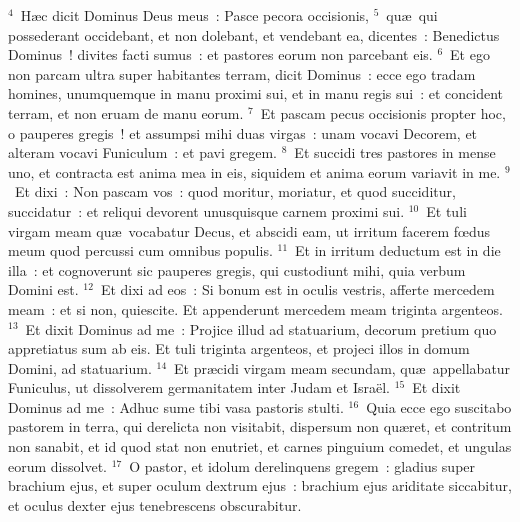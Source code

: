 ${}^{4}$~H\ae c dicit Dominus Deus meus~: Pasce pecora occisionis,
${}^{5}$~qu\ae\ qui possederant occidebant, et non dolebant, et vendebant ea, dicentes~: Benedictus Dominus~! divites facti sumus~: et pastores eorum non parcebant eis.
${}^{6}$~Et ego non parcam ultra super habitantes terram, dicit Dominus~: ecce ego tradam homines, unumquemque in manu proximi sui, et in manu regis sui~: et concident terram, et non eruam de manu eorum.
${}^{7}$~Et pascam pecus occisionis propter hoc, o pauperes gregis~! et assumpsi mihi duas virgas~: unam vocavi Decorem, et alteram vocavi Funiculum~: et pavi gregem.
${}^{8}$~Et succidi tres pastores in mense uno, et contracta est anima mea in eis, siquidem et anima eorum variavit in me.
${}^{9}$~Et dixi~: Non pascam vos~: quod moritur, moriatur, et quod succiditur, succidatur~: et reliqui devorent unusquisque carnem proximi sui.
${}^{10}$~Et tuli virgam meam qu\ae\ vocabatur Decus, et abscidi eam, ut irritum facerem fœdus meum quod percussi cum omnibus populis.
${}^{11}$~Et in irritum deductum est in die illa~: et cognoverunt sic pauperes gregis, qui custodiunt mihi, quia verbum Domini est.
${}^{12}$~Et dixi ad eos~: Si bonum est in oculis vestris, afferte mercedem meam~: et si non, quiescite. Et appenderunt mercedem meam triginta argenteos.
${}^{13}$~Et dixit Dominus ad me~: Projice illud ad statuarium, decorum pretium quo appretiatus sum ab eis. Et tuli triginta argenteos, et projeci illos in domum Domini, ad statuarium.
${}^{14}$~Et pr\ae cidi virgam meam secundam, qu\ae\ appellabatur Funiculus, ut dissolverem germanitatem inter Judam et Isra\"el.
${}^{15}$~Et dixit Dominus ad me~: Adhuc sume tibi vasa pastoris stulti.
${}^{16}$~Quia ecce ego suscitabo pastorem in terra, qui derelicta non visitabit, dispersum non qu\ae ret, et contritum non sanabit, et id quod stat non enutriet, et carnes pinguium comedet, et ungulas eorum dissolvet.
${}^{17}$~O pastor, et idolum derelinquens gregem~: gladius super brachium ejus, et super oculum dextrum ejus~: brachium ejus ariditate siccabitur, et oculus dexter ejus tenebrescens obscurabitur.


